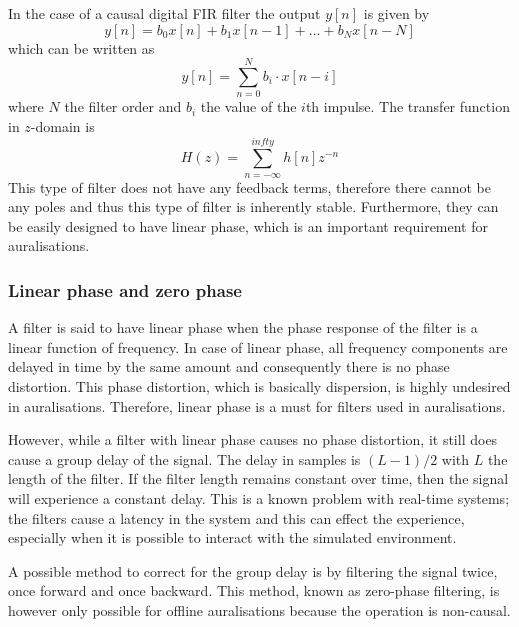 In the case of a causal digital FIR filter the output $y[n]$ is given by
\begin{equation}
 y[n] = b_0 x[n] + b_1 x[n-1] + \dots + b_N x[n-N]
\end{equation}
which can be written as
\begin{equation}
 y[n] = \sum_{n=0}^{N} b_i \cdot x[n-i]
\end{equation}
where $N$ the filter order and $b_i$ the value of the $i$th impulse.
The transfer function in $z$-domain is
\begin{equation}
H(z) = \sum_{n=-\infty}^{infty} h[n] z^{-n}
\end{equation}
This type of filter does not have any feedback terms, therefore there cannot be any poles and thus this type of filter is inherently stable.
Furthermore, they can be easily designed to have linear phase, which is an important requirement for auralisations.

\subsubsection{Linear phase and zero phase}\label{sec:theory:signal-processing:linear-phase}
A filter is said to have linear phase when the phase response of the filter is a 
linear function of frequency. In case of linear phase, all frequency components 
are delayed in time by the same amount and consequently there is no phase 
distortion. This phase distortion, which is basically dispersion, is highly 
undesired in auralisations. Therefore, linear phase is a must for filters used 
in auralisations. 

However, while a filter with linear phase causes no phase distortion, it still 
does cause a group delay of the signal. The delay in samples is $(L-1)/2$ with 
$L$ the length of the filter. If the filter length remains constant over time, 
then the signal will experience a constant delay. This is a known problem with 
real-time systems; the filters cause a latency in the system and this can effect 
the experience, especially when it is possible to interact with the simulated 
environment. 

A possible method to correct for the group delay is by filtering the signal 
twice, once forward and once backward. This method, known as zero-phase 
filtering, is however only possible for offline auralisations because the 
operation is non-causal. 






